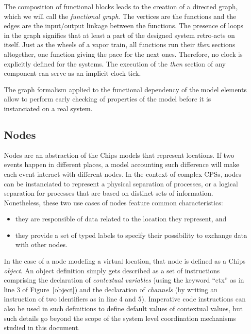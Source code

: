 \documentclass{article}
\begin{document}
The composition of functional blocks leads to the creation of a directed graph, which we will call the \emph{functional graph}. The vertices are the functions and the edges are the input/output linkage between the functions. The presence of loops in the graph signifies that at least a part of the designed system retro-acts on itself. Just as the wheels of a vapor train, all functions run their \emph{then} sections altogether, one function giving the pace for the next ones. Therefore, no clock is explicitly defined for the systems. The execution of the \emph{then} section of any component can serve as an implicit clock tick.

The graph formalism applied to the functional dependency of the model elements allow to perform early checking of properties of the model before it is instanciated on a real system.

\subsection{Nodes}

Nodes are an abstraction of the Chips models that represent locations. If two events happen in different places, a model accounting such difference will make each event interact with different nodes. In the context of complex CPSs, nodes can be instanciated to represent a physical separation of processes, or a logical separation for processes that are based on distinct sets of information. Nonetheless, these two use cases of nodes feature common characteristics:
\begin{itemize}
    \item they are responsible of data related to the location they represent, and
    \item they provide a set of typed labels to specify their possibility to exchange data with other nodes.
\end{itemize}

In the case of a node modeling a virtual location, that node is defined as a Chips \emph{object}. An object definition simply gets described as a set of instructions comprising the declaration of \emph{contextual variables} (using the keyword ``ctx'' as in line 3 of Figure~\ref{object}) and the declaration of \emph{channels} (by writing an instruction of two identifiers as in line 4 and 5). Imperative code instructions can also be used in such definitions to define default values of contextual values, but such details go beyond the scope of the system level coordination mechanisms studied in this document.  
\end{document}
